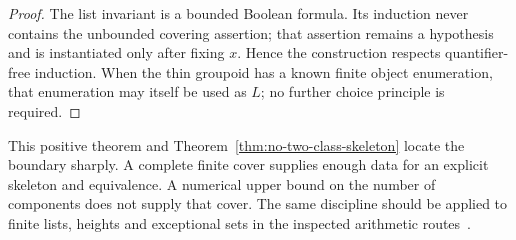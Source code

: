 \begin{proof}
The list invariant is a bounded Boolean formula. Its induction never
contains the unbounded covering assertion; that assertion remains a
hypothesis and is instantiated only after fixing $x$. Hence the
construction respects quantifier-free induction. When the thin groupoid
has a known finite object enumeration, that enumeration may itself be used as
$L$; no further choice principle is required.
\end{proof}

This positive theorem and Theorem~\ref{thm:no-two-class-skeleton}
locate the boundary sharply. A complete finite cover supplies enough
data for an explicit skeleton and equivalence. A numerical upper bound
on the number of components does not supply that cover. The same
discipline should be applied to finite lists, heights and exceptional
sets in the inspected arithmetic routes~\cite{repo-mw,repo-siegel,repo-faltings}.
